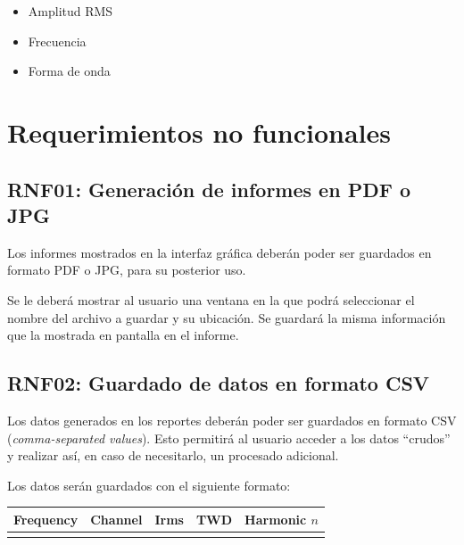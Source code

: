 \documentclass[titlepage, 12pt]{article}
\begin{document}
    \begin{itemize}
      \item Amplitud RMS
      \item Frecuencia
      \item Forma de onda
    \end{itemize}


\section{Requerimientos no funcionales}

  \subsection{RNF01: Generación de informes en PDF o JPG}
  Los informes mostrados en la interfaz gráfica deberán poder ser guardados en formato PDF o JPG, para su posterior uso.

  Se le deberá mostrar al usuario una ventana en la que podrá seleccionar el nombre del archivo a guardar y su ubicación. Se guardará la misma información que la mostrada en pantalla en el informe.

  \subsection{RNF02: Guardado de datos en formato CSV}
  Los datos generados en los reportes deberán poder ser guardados en formato CSV (\emph{comma-separated values}). Esto permitirá al usuario acceder a los datos ``crudos'' y realizar así, en caso de necesitarlo, un procesado adicional.

  Los datos serán guardados con el siguiente formato:

  \begin{table}[!hbtp]
    \centering
      \begin{tabular}{|c|c|c|l|l|}
      \hline
      \rowcolor[HTML]{C0C0C0}
      Frequency & Channel & Irms & TWD & Harmonic $n$ \\ \hline
                &         &      &     &              \\ \hline
      \end{tabular}
  \end{table}
\end{document}
